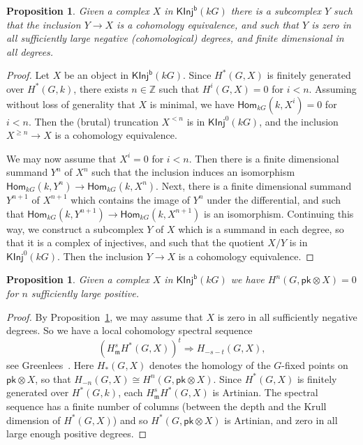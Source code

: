 \documentclass[12pt]{amsart}
\newcommand{\Hom}{\mathsf{Hom}}
\newcommand{\kG}{\kk G}
\newcommand{\kk}{k}
\newcommand{\KInj}{\mathsf{KInj}}
\newcommand{\KInjb}{\KInj^{\mathsf{b}}}
\newcommand{\pk}{\mathsf{pk}}
\newcommand{\bZ}{\mathbb Z}
\newcommand{\fm}{\mathfrak{m}}
\renewcommand{\ge}{\geqslant}
\numberwithin{equation}{section}
\theoremstyle{plain}
\newtheorem{proposition}[equation]{Proposition}
\theoremstyle{definition}
\theoremstyle{remark}
\begin{document}
\begin{proposition}\label{pr:whittle-down}
Given a complex $X$ in $\KInjb(\kG)$ there is a subcomplex $Y$
such that the inclusion $Y\to X$  is a cohomology equivalence,
and such that $Y$ is zero in all sufficiently large negative (cohomological)
degrees, and finite dimensional in all degrees.
\end{proposition}
\begin{proof}
Let $X$ be an object in $\KInjb(\kG)$.
Since $H^*(G,X)$ is finitely generated over $H^*(G,\kk)$, 
there exists $n\in \bZ$ such that
$H^i(G,X)=0$ for $i< n$. 
Assuming without loss of generality that $X$ is minimal, we have
$\Hom_{\kG}(\kk,X^i)=0$ for $i< n$. Then the (brutal)
truncation $X^{< n}$ is in $\KInj^0(\kG)$, and the inclusion 
$X^{\ge  n}\to X$ is a cohomology equivalence. 

We may now assume that $X^i=0$ for $i<n$. Then there is a finite
dimensional summand $Y^n$ of $X^n$ such that the inclusion
induces an isomorphism $\Hom_{\kG}(\kk,Y^n) \to \Hom_{\kG}(\kk,X^n)$. 
Next, there is a finite dimensional summand $Y^{n+1}$ of $X^{n+1}$
which contains the image of $Y^n$ under the differential, and such
that $\Hom_{\kG}(\kk,Y^{n+1}) \to \Hom_{\kG}(\kk,X^{n+1})$ is an
isomorphism. Continuing this way, we construct a subcomplex $Y$ of $X$
which is a summand in each degree, so that it is a complex of
injectives, and such that the quotient $X/Y$ is in
$\KInj^0(\kG)$. Then the inclusion $Y \to X$ is a cohomology equivalence.
\end{proof}


\begin{proposition}\label{pr:pk-Artinian}
Given a complex $X$ in $\KInjb(\kG)$ 
we have 
$H^n(G,\pk \otimes X)=0$ for $n$ sufficiently large positive.
\end{proposition}
\begin{proof}
By Proposition~\ref{pr:whittle-down}, we may assume 
that $X$ is zero in all sufficiently
negative degrees. So we have a local cohomology spectral sequence
\[ (H^s_\fm H^*(G,X))^t \Rightarrow H_{-s-t}(G,X), \]
see Greenlees~\cite[\S2]{Greenlees:1995a}. Here $H_*(G,X)$ denotes the
homology of the $G$-fixed points on $\pk\otimes X$, so that
$H_{-n}(G,X) \cong H^n(G,\pk\otimes X)$. Since $H^*(G,X)$ is
finitely generated over $H^*(G,\kk)$, each $H^s_\fm H^*(G,X)$ is
Artinian. The spectral sequence has a finite number of columns
(between the depth and the Krull dimension of $H^*(G,X)$) and so
$H^*(G,\pk\otimes X)$ is Artinian, and zero in all large enough
positive degrees.
\end{proof}
\end{document}

